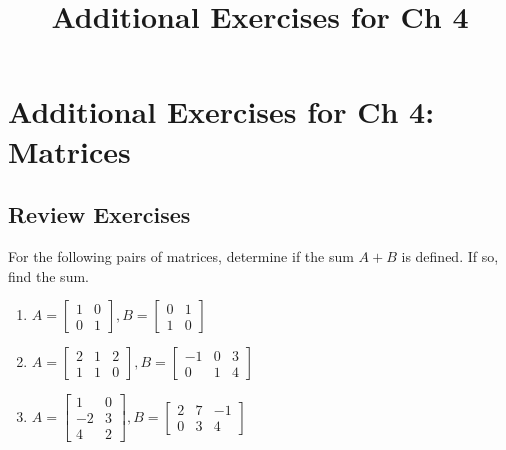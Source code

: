 \documentclass{ximera}
\title{Additional Exercises for Ch 4} \license{CC BY-NC-SA 4.0}
\begin{document}
\begin{abstract}
\end{abstract}
\maketitle

\section*{Additional Exercises for Ch 4: Matrices}

\subsection*{Review Exercises}

\begin{problem}\label{prb:4.1} For the following pairs of matrices, determine if the sum $A + B$ is defined. If so, find the sum.
\begin{enumerate}
\item
$A = \left[ \begin{array}{rr}
1 & 0 \\
0 & 1
\end{array} \right],
B = \left[ \begin{array}{rr}
0 & 1 \\
1 & 0
\end{array} \right]$

\item
$A = \left[ \begin{array}{rrr}
2 & 1 & 2 \\
1 & 1 & 0
\end{array} \right],  B = \left[ \begin{array}{rrr}
-1 & 0 & 3\\
0 & 1 & 4
\end{array} \right]$

\item
$A = \left[ \begin{array}{rr}
1 & 0 \\
-2 & 3 \\
4 & 2
\end{array} \right], B = \left[ \begin{array}{rrr}
2 & 7 & -1 \\
0 & 3 & 4
\end{array} \right]$
\end{enumerate}
\end{problem}
\end{document}
